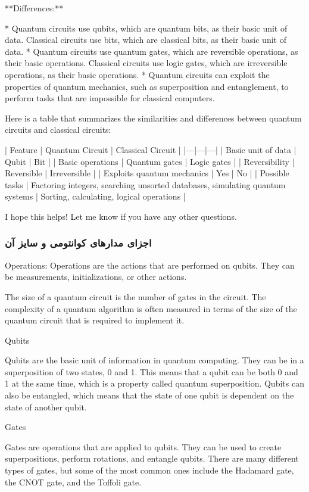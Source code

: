 \documentclass{book}
\begin{document}
**Differences:**

* Quantum circuits use qubits, which are quantum bits, as their basic unit of data. Classical circuits use bits, which are classical bits, as their basic unit of data.
* Quantum circuits use quantum gates, which are reversible operations, as their basic operations. Classical circuits use logic gates, which are irreversible operations, as their basic operations.
* Quantum circuits can exploit the properties of quantum mechanics, such as superposition and entanglement, to perform tasks that are impossible for classical computers.

Here is a table that summarizes the similarities and differences between quantum circuits and classical circuits:

| Feature | Quantum Circuit | Classical Circuit |
|---|---|---|
| Basic unit of data | Qubit | Bit |
| Basic operations | Quantum gates | Logic gates |
| Reversibility | Reversible | Irreversible |
| Exploits quantum mechanics | Yes | No |
| Possible tasks | Factoring integers, searching unsorted databases, simulating quantum systems | Sorting, calculating, logical operations |

I hope this helps! Let me know if you have any other questions.


\subsubsection{اجزای مدار‌های کوانتومی و سایز آن }
Operations: Operations are the actions that are performed on qubits. They can be measurements, initializations, or other actions.


The size of a quantum circuit is the number of gates in the circuit. The complexity of a quantum algorithm is often measured in terms of the size of the quantum circuit that is required to implement it.


Qubits

Qubits are the basic unit of information in quantum computing. They can be in a superposition of two states, 0 and 1. This means that a qubit can be both 0 and 1 at the same time, which is a property called quantum superposition. Qubits can also be entangled, which means that the state of one qubit is dependent on the state of another qubit.

Gates

Gates are operations that are applied to qubits. They can be used to create superpositions, perform rotations, and entangle qubits. There are many different types of gates, but some of the most common ones include the Hadamard gate, the CNOT gate, and the Toffoli gate.
\end{document}
